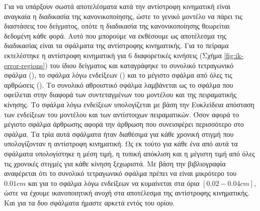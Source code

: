 Για να υπάρξουν σωστά αποτελέσματα κατά την αντίστροφη κινηματική είναι αναγκαία η διαδικασία της κανονικοποίησης, ώστε το γενικό μοντέλο να πάρει τις διαστάσεις του δείγματος, οπότε η διαδικασία της κανονικοποίησης θεωρείται δεδομένη κάθε φορά. Αυτό που μπορούμε να εκθέσουμε ως αποτέλεσμα της διαδικασίας είναι τα σφάλματα της αντίστροφης κινηματικής. Για το πείραμα εκτελέστηκε η αντίστροφη κινηματική για 6 διαφορετικές κινήσεις (Σχήμα \ref{fig:ik-error-regions}) του ίδιου δείγματος και καταγράφηκε το συνολικό τετραγωνικό σφάλμα (), το σφάλμα λόγω ενδείξεων () και το μέγιστο σφάλμα από όλες τις αρθρώσεις (). Το συνολικό αθροιστικό σφάλμα λαμβάνεται ως το σφάλμα που οφείλεται στην διαφορά των συντεταγμένων του μοντέλου και της πειραματικής κίνησης. Το σφάλμα λόγω ενδείξεων υπολογίζεται με βάση την Ευκλείδεια απόσταση των ενδείξεων του μοντέλου και των αντίστοιχων πειραματικών. Όσον αφορά το μέγιστο σφάλμα άρθρωσης αφορά την άρθρωση που συνεισφέρει περισσότερο στο σφάλμα. Τα τρία αυτά σφάλματα ήταν διαθέσιμα για κάθε χρονική στιγμή που υπολογίζονταν η αντίστροφη κινηματική. Ως εκ τούτο για κάθε ένα από αυτά τα σφάλματα υπολογίστηκε η μέση τιμή, η τυπική απόκλιση και η μέγιστη τιμή από όλες τις χρονικές στιγμές για κάθε κίνηση ξεχωριστά. Με βάση την βιβλιογραφία αναφέρεται ότι το συνολικό τετραγωνικό σφάλμα πρέπει να είναι μικρότερο του $0.01cm$ και για το σφάλμα λόγω ενδείξεων να κυμαίνεται στα όρια $[0.02-0.04cm]$, ώστε να έχουμε ικανοποιητική ανοχή στα αποτέλεσμα της αντίστροφης κινηματικής. Και για τα δυο σφάλματα ήμαστε αρκετά εντός του ορίου.


